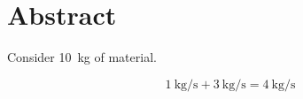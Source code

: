 \chapter*{Abstract}

Consider \SI{10}{\kilogram} of material.

\begin{equation}
    \SI{1}{\kilogram\per\second} + \SI{3}{\kilogram\per\second} = \SI{4}{\kilogram\per\second}
\end{equation}



